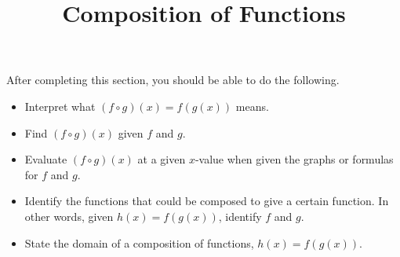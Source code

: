 \documentclass{ximera}
\title{Composition of Functions}
\begin{document}
\begin{abstract} 
\end{abstract}

\maketitle

\begin{sectionOutcomes}
After completing this section, you should be able to do the following.

\begin{itemize}
	\item Interpret what $(f \circ g)(x) = f(g(x))$ means.
	\item Find $(f \circ g)(x)$ given $f$ and $g$.
    \item Evaluate $(f \circ g)(x)$ at a given $x$-value when given the graphs or formulas for $f$ and $g$.
    \item Identify the functions that could be composed to give a certain function.  In other words, given $h(x) = f(g(x))$, identify $f$ and $g$. 
    \item State the domain of a composition of functions, $h(x) = f(g(x))$.


\end{itemize}
\end{sectionOutcomes}
\end{document}
